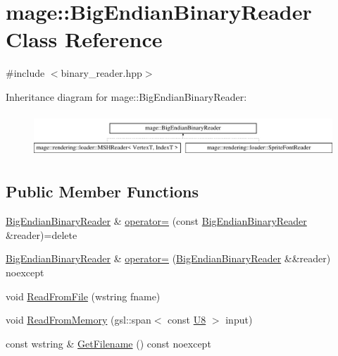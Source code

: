 \hypertarget{classmage_1_1_big_endian_binary_reader}{}\section{mage\+:\+:Big\+Endian\+Binary\+Reader Class Reference}
\label{classmage_1_1_big_endian_binary_reader}


{\ttfamily \#include $<$binary\+\_\+reader.\+hpp$>$}

Inheritance diagram for mage\+:\+:Big\+Endian\+Binary\+Reader\+:\begin{figure}[H]
\begin{center}
\leavevmode
\includegraphics[height=1.637427cm]{classmage_1_1_big_endian_binary_reader}
\end{center}
\end{figure}
\subsection*{Public Member Functions}
\begin{DoxyCompactItemize}
\item 
\mbox{\hyperlink{classmage_1_1_big_endian_binary_reader}{Big\+Endian\+Binary\+Reader}} \& \mbox{\hyperlink{classmage_1_1_big_endian_binary_reader_abd4b24df4219469a8c2e9253b1cad405}{operator=}} (const \mbox{\hyperlink{classmage_1_1_big_endian_binary_reader}{Big\+Endian\+Binary\+Reader}} \&reader)=delete
\item 
\mbox{\hyperlink{classmage_1_1_big_endian_binary_reader}{Big\+Endian\+Binary\+Reader}} \& \mbox{\hyperlink{classmage_1_1_big_endian_binary_reader_ac37539cb08ea9278daf5628a0c5895d8}{operator=}} (\mbox{\hyperlink{classmage_1_1_big_endian_binary_reader}{Big\+Endian\+Binary\+Reader}} \&\&reader) noexcept
\item 
void \mbox{\hyperlink{classmage_1_1_big_endian_binary_reader_a68db676feaa42c1c3a9bf16d0680b04f}{Read\+From\+File}} (wstring fname)
\item 
void \mbox{\hyperlink{classmage_1_1_big_endian_binary_reader_afc48490dca5042078726a1ec3fe7abe7}{Read\+From\+Memory}} (gsl\+::span$<$ const \mbox{\hyperlink{namespacemage_afc638980bc6154f15af5e2d93a0e0ea9}{U8}} $>$ input)
\item 
const wstring \& \mbox{\hyperlink{classmage_1_1_big_endian_binary_reader_a801558f27606dbc681809178aaaaacd1}{Get\+Filename}} () const noexcept
\end{DoxyCompactItemize}
